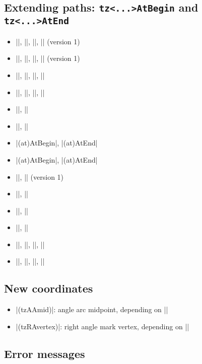 \subsection{Extending paths: \texttt{\bs tz<...>AtBegin} and \texttt{\bs tz<...>AtEnd}}

\begin{itemize}\tightlist
\item |\tztoAtBegin|, |\tztoAtEnd|, |\tztosAtBegin|, |\tztosAtEnd| (version 1)
\item |\tztoAtBegin|, |\tztoAtEnd|, |\tztosAtBegin|, |\tztosAtEnd| (version 1)
\item |\tzlineAtBegin|, |\tzlineAtEnd|, |\tzlinesAtBegin|, |\tzlinesAtEnd|
\item |\tzlinkAtBegin|, |\tzlinkAtEnd|, |\tzlinksAtBegin|, |\tzlinksAtEnd|
\item |\tzbezierAtBegin|, |\tzbezierAtEnd|
\item |\tzparabolaAtBegin|, |\tzparabolaAtEnd|
%
\listdivider
\item |\tzvfn(at)AtBegin|, |\tzvfn(at)AtEnd|
\item |\tzhfn(at)AtBegin|, |\tzhfn(at)AtEnd|
%
\listdivider
\item |\tzfnAtBegin|, |\tzfnAtEnd| (version 1)
\item |\tzfnofyAtBegin|, |\tzfnofyAtEnd|
\item |\tzLFnAtBegin|, |\tzLFnAtEnd|
\item |\tzLfnofyAtBegin|, |\tzLFnofyAtEnd|
\item |\tzfnminAtBegin|, |\tzfnminAtEnd|, |\tzfnmaxAtBegin|, |\tzfnmaxAtEnd|
\item |\tzplotAtBegin|, |\tzplotAtEnd|, |\tzplotcurveAtBegin|, |\tzplotcurveAtEnd|
\end{itemize}



\subsection{New coordinates}

\begin{itemize}\tightlist
\item |(tzAAmid)|: angle arc midpoint, depending on |\tzanglemark|
\item |(tzRAvertex)|: right angle mark vertex, depending on |\tzrightanglemark|
\end{itemize}

\subsection{Error messages}

